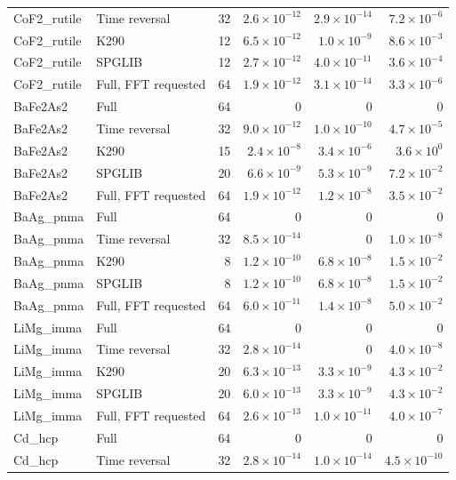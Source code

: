 \begin{table}[htbp]
\begin{tabular}{llrrrr}
CoF2\_rutile & Time reversal & 32 & $2.6\times10^{-12}$ & $2.9\times10^{-14}$ & $7.2\times10^{-6}$ \\
CoF2\_rutile & K290 & 12 & $6.5\times10^{-12}$ & $1.0\times10^{-9}$ & $8.6\times10^{-3}$ \\
CoF2\_rutile & SPGLIB & 12 & $2.7\times10^{-12}$ & $4.0\times10^{-11}$ & $3.6\times10^{-4}$ \\
CoF2\_rutile & Full, FFT requested & 64 & $1.9\times10^{-12}$ & $3.1\times10^{-14}$ & $3.3\times10^{-6}$ \\
BaFe2As2 & Full & 64 & $0$ & $0$ & $0$ \\
BaFe2As2 & Time reversal & 32 & $9.0\times10^{-12}$ & $1.0\times10^{-10}$ & $4.7\times10^{-5}$ \\
BaFe2As2 & K290 & 15 & $2.4\times10^{-8}$ & $3.4\times10^{-6}$ & $3.6\times10^{0}$ \\
BaFe2As2 & SPGLIB & 20 & $6.6\times10^{-9}$ & $5.3\times10^{-9}$ & $7.2\times10^{-2}$ \\
BaFe2As2 & Full, FFT requested & 64 & $1.9\times10^{-12}$ & $1.2\times10^{-8}$ & $3.5\times10^{-2}$ \\
BaAg\_pnma & Full & 64 & $0$ & $0$ & $0$ \\
BaAg\_pnma & Time reversal & 32 & $8.5\times10^{-14}$ & $0$ & $1.0\times10^{-8}$ \\
BaAg\_pnma & K290 & 8 & $1.2\times10^{-10}$ & $6.8\times10^{-8}$ & $1.5\times10^{-2}$ \\
BaAg\_pnma & SPGLIB & 8 & $1.2\times10^{-10}$ & $6.8\times10^{-8}$ & $1.5\times10^{-2}$ \\
BaAg\_pnma & Full, FFT requested & 64 & $6.0\times10^{-11}$ & $1.4\times10^{-8}$ & $5.0\times10^{-2}$ \\
LiMg\_imma & Full & 64 & $0$ & $0$ & $0$ \\
LiMg\_imma & Time reversal & 32 & $2.8\times10^{-14}$ & $0$ & $4.0\times10^{-8}$ \\
LiMg\_imma & K290 & 20 & $6.3\times10^{-13}$ & $3.3\times10^{-9}$ & $4.3\times10^{-2}$ \\
LiMg\_imma & SPGLIB & 20 & $6.0\times10^{-13}$ & $3.3\times10^{-9}$ & $4.3\times10^{-2}$ \\
LiMg\_imma & Full, FFT requested & 64 & $2.6\times10^{-13}$ & $1.0\times10^{-11}$ & $4.0\times10^{-7}$ \\
Cd\_hcp & Full & 64 & $0$ & $0$ & $0$ \\
Cd\_hcp & Time reversal & 32 & $2.8\times10^{-14}$ & $1.0\times10^{-14}$ & $4.5\times10^{-10}$ \\

\end{tabular}
\end{table}
